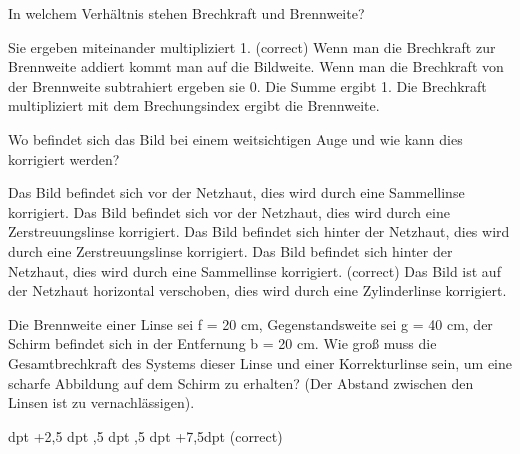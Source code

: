 \documentclass[11pt]{exam}
\begin{document}
\setlength{\voffset}{-0.5in}
\setlength{\headsep}{5pt}

\hspace{2mm}
 \hspace{5mm}
\vspace{4mm}

\begin{questions}

\question In welchem Verhältnis stehen Brechkraft und Brennweite?

\begin{choices}
	\choice Sie ergeben miteinander multipliziert 1. (correct)
	\choice Wenn man die Brechkraft zur Brennweite addiert kommt man auf die Bildweite.
	\choice Wenn man die Brechkraft von der Brennweite subtrahiert ergeben sie 0.
	\choice Die Summe ergibt 1.
	\choice Die Brechkraft multipliziert mit dem Brechungsindex ergibt die Brennweite.
\end{choices}

\vspace{3mm}\question Wo befindet sich das Bild bei einem weitsichtigen Auge und wie kann dies korrigiert werden?

\begin{choices}
	\choice Das Bild befindet sich vor der Netzhaut, dies wird durch eine Sammellinse korrigiert.
	\choice Das Bild befindet sich vor der Netzhaut, dies wird durch eine Zerstreuungslinse korrigiert.
	\choice Das Bild befindet sich hinter der Netzhaut, dies wird durch eine Zerstreuungslinse korrigiert.
	\choice Das Bild befindet sich hinter der Netzhaut, dies wird durch eine Sammellinse korrigiert. (correct)
	\choice Das Bild ist auf der Netzhaut horizontal verschoben, dies wird durch eine Zylinderlinse korrigiert.
\end{choices}

\vspace{3mm}\question Die Brennweite einer Linse sei f = 20 cm, Gegenstandsweite sei g = 40 cm, der Schirm befindet sich in der Entfernung b = 20 cm. Wie groß muss die Gesamtbrechkraft des Systems dieser Linse und einer Korrekturlinse sein, um eine scharfe Abbildung auf dem Schirm zu erhalten? (Der Abstand zwischen den Linsen ist zu vernachlässigen).

\begin{choices}
	 dpt
	\choice +2,5 dpt
	,5 dpt
	,5 dpt
	\choice +7,5dpt (correct)
\end{choices}


\end{questions}
\end{document}
